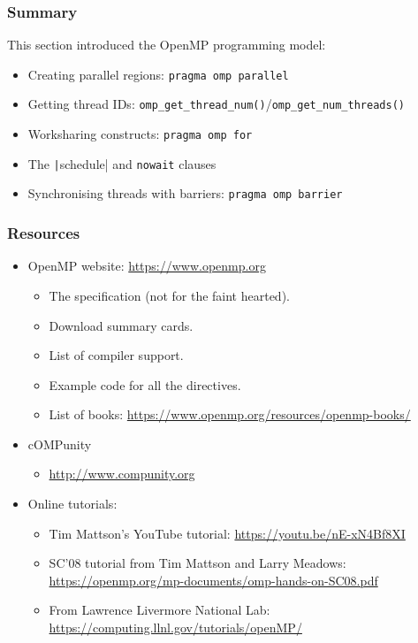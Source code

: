 \documentclass{beamer}
\begin{document}
\begin{frame}
\frametitle{Summary}
This section introduced the OpenMP programming model:
\begin{itemize}
  \item Creating parallel regions: \texttt{pragma omp parallel}
  \item Getting thread IDs: \texttt{omp_get_thread_num()}/\texttt{omp_get_num_threads()}
  \item Worksharing constructs: \texttt{pragma omp for}
  \item The \texttt|schedule| and \texttt{nowait} clauses
  \item Synchronising threads with barriers: \texttt{pragma omp barrier}
\end{itemize}
\end{frame}

 \begin{frame}
 \frametitle{Resources}
 \begin{itemize}
 \item OpenMP website: \url{https://www.openmp.org}
   \begin{itemize}
     \item The specification (not for the faint hearted).
     \item Download summary cards.
     \item List of compiler support.
     \item Example code for all the directives.
     \item List of books: \url{https://www.openmp.org/resources/openmp-books/}
   \end{itemize}
 
 \item cOMPunity
   \begin{itemize}
     \item \url{http://www.compunity.org}
   \end{itemize}
 
 \item Online tutorials:
   \begin{itemize}
     \item Tim Mattson's YouTube tutorial: \url{https://youtu.be/nE-xN4Bf8XI}
     \item SC'08 tutorial from Tim Mattson and Larry Meadows: \url{https://openmp.org/mp-documents/omp-hands-on-SC08.pdf}
     \item From Lawrence Livermore National Lab: \url{https://computing.llnl.gov/tutorials/openMP/}
   \end{itemize}
 
 \end{itemize}
 
 \end{frame}

\end{document}
